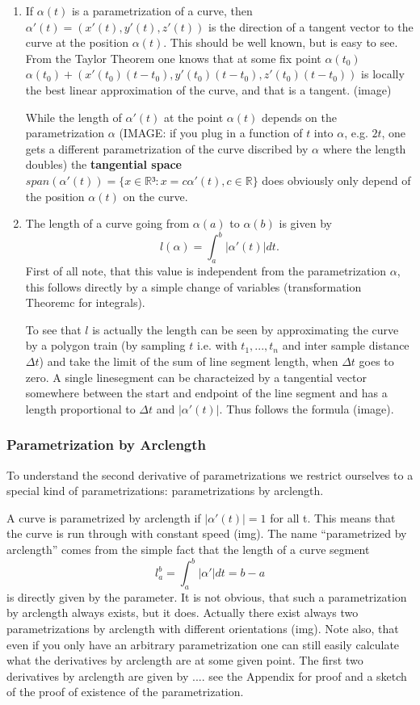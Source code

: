 	\begin{enumerate}
 		\item  If $\alpha (t)$ is a parametrization of a curve, then $\alpha'(t) = (x'(t),y'(t),z'(t))$ is the direction of a tangent vector to the curve at the position $\alpha(t)$. This should be well known, but is easy to see. From the Taylor Theorem one knows that at some fix point $\alpha(t_0)$ $\alpha(t_0) + (x'(t_0) (t-t_0),y'(t_0) (t-t_0),z'(t_0) (t-t_0))$ is locally the best linear approximation of the curve, and that is a tangent. (image)

		While the length of $\alpha'(t)$ at the point $\alpha(t)$ depends on the parametrization $\alpha$ (IMAGE: if you plug in a function of $t$ into $\alpha$, e.g. $2t$, one gets a different parametrization of the curve discribed by $\alpha$ where the length doubles) the \textbf{tangential space} $span(\alpha'(t)) = \{x \in \mathbb R³: x = c \alpha'(t), c \in \mathbb R\}$ does obviously only depend of the position $\alpha(t)$ on the curve. 

		\item  The length of a curve going from $\alpha(a)$ to $\alpha(b)$ is given by
		\[l(\alpha) = \int_a^b |\alpha'(t)| dt.\]
		First of all note, that this value is independent from the parametrization $\alpha$, this follows directly by a simple change of variables (transformation Theoremc for integrals). 

		To see that $l$ is actually the length can be seen by approximating the curve by a polygon train (by sampling $t$ i.e. with $t_1,...,t_n$ and inter sample distance $\Delta t$) and take the limit of the sum of line segment length, when $\Delta t$ goes to zero. A single linesegment can be characteized by a tangential vector somewhere between the start and endpoint of the line segment and has a length proportional to $\Delta t$ and $|\alpha'(t)|$. Thus follows the formula (image).

	\end{enumerate}

	\subsubsection{Parametrization by Arclength}
	To understand the second derivative of parametrizations we restrict ourselves to a special kind of parametrizations: parametrizations by arclength. 
	
	A curve is parametrized by arclength if $|\alpha'(t)|=1$ for all t. This means that the curve is run through with constant speed (img). The name ``parametrized by arclength'' comes from the simple fact that the length of a curve segment 
\[l_a^b = \int_a^b |\alpha'| dt = b-a\]
	is directly given by the parameter. It is not obvious, that such a parametrization by arclength always exists, but it does. Actually there exist always two parametrizations by arclength with different orientations (img). Note also, that even if you only have an arbitrary parametrization one can still easily calculate what the derivatives by arclength are at some given point. The first two derivatives by arclength are given by .... see the Appendix for proof and a sketch of the proof of existence of the parametrization.

